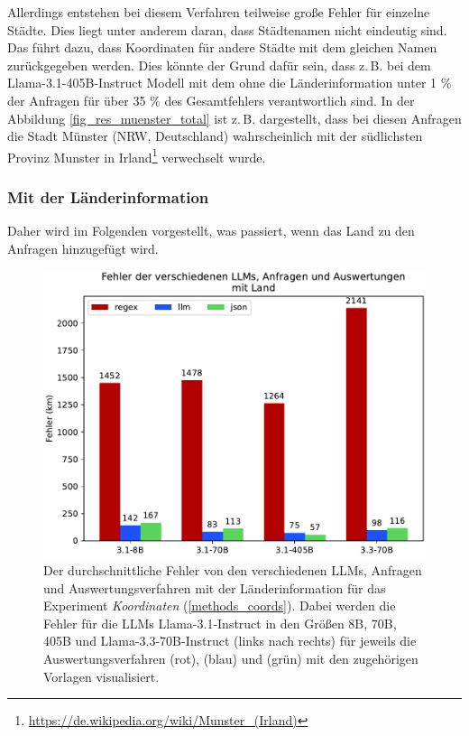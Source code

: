 Allerdings entstehen bei diesem Verfahren teilweise große Fehler für einzelne Städte.
Dies liegt unter anderem daran, dass Städtenamen nicht eindeutig sind.
Das führt dazu, dass Koordinaten für andere Städte mit dem gleichen Namen zurückgegeben werden.
Dies könnte der Grund dafür sein, dass z.\,B. bei dem Llama-3.1-405B-Instruct Modell mit dem \jsonv{} ohne die Länderinformation unter 1 {\%} der Anfragen für über 35 {\%} des Gesamtfehlers verantwortlich sind.
In der Abbildung \ref{fig_res_muenster_total} ist z.\,B. dargestellt, dass bei diesen Anfragen die Stadt Münster (NRW, Deutschland) wahrscheinlich mit der südlichsten Provinz Munster in Irland\footnote{\url{https://de.wikipedia.org/wiki/Munster_(Irland)}} verwechselt wurde.

\subsubsection*{Mit der Länderinformation}
Daher wird im Folgenden vorgestellt, was passiert, wenn das Land zu den Anfragen hinzugefügt wird.

\begin{figure}[tb] %
    \centering
    \includegraphics[width=0.7\columnwidth]{img/country_error_no_std.pdf}
    \caption{Der durchschnittliche Fehler von den verschiedenen LLMs, Anfragen und Auswertungsverfahren mit der Länderinformation für das Experiment \textit{Koordinaten} (\ref{methods_coords}). Dabei werden die Fehler für die LLMs Llama-3.1-Instruct in den Größen 8B, 70B, 405B und Llama-3.3-70B-Instruct (links nach rechts) für jeweils die Auswertungsverfahren \regex{} (rot), \llm{} (blau) und \json{} (grün) mit den zugehörigen Vorlagen visualisiert.}
    \label{fig_res_coords_error_country}
\end{figure}

